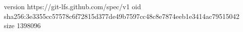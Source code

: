 version https://git-lfs.github.com/spec/v1
oid sha256:3e3355cc57578c6f72815d377de49b7597cc48c8e7874eeb1e3414ac79515042
size 1398096
